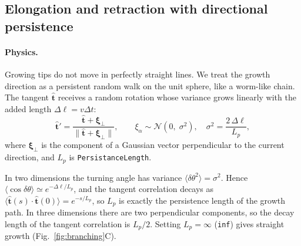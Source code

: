 \documentclass[11pt,a4paper]{article}
\newcommand{\code}[1]{\texttt{#1}}
\newcommand{\vect}[1]{\bm{#1}}
\begin{document}
\FloatBarrier
\subsection{Elongation and retraction with directional persistence}
\paragraph{Physics.}
Growing tips do not move in perfectly straight lines. We treat the growth direction as a persistent random walk on the unit sphere, like a worm-like chain. The tangent $\hat{\vect t}$ receives a random rotation whose variance grows linearly with the added length $\Delta\ell=v\Delta t$:
\begin{equation}
  \hat{\vect t}' = \frac{\hat{\vect t}+\vect\xi_\perp}{\lVert\hat{\vect t}+\vect\xi_\perp\rVert},\qquad
  \xi_\alpha\sim\mathcal N\!\left(0,\;\sigma^2\right),\quad \sigma^2=\frac{2\,\Delta\ell}{L_p},
\end{equation}
where $\vect\xi_\perp$ is the component of a Gaussian vector perpendicular to the current direction, and $L_p$ is \code{PersistanceLength}.

In two dimensions the turning angle has variance $\langle\delta\theta^2\rangle=\sigma^2$. Hence $\langle\cos\delta\theta\rangle\simeq e^{-\Delta\ell/L_p}$, and the tangent correlation decays as $\langle\hat{\vect t}(s)\cdot\hat{\vect t}(0)\rangle=e^{-s/L_p}$, so $L_p$ is exactly the persistence length of the growth path. In three dimensions there are two perpendicular components, so the decay length of the tangent correlation is $L_p/2$. Setting $L_p=\infty$ (\code{inf}) gives straight growth (Fig.~\ref{fig:branching}C).
\end{document}
